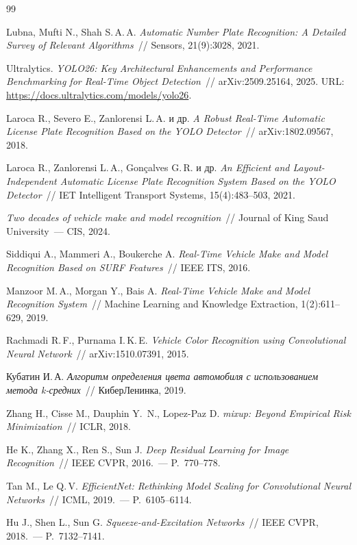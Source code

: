 \documentclass[10pt,a4paper]{report}
\numberwithin{equation}{chapter}
\numberwithin{figure}{chapter}
\numberwithin{table}{chapter}
\begin{document}
\begin{thebibliography}{99}

Lubna, Mufti N., Shah S.\,A.\,A.
\textit{Automatic Number Plate Recognition: A Detailed Survey of Relevant Algorithms}~//
Sensors, 21(9):3028, 2021.

Ultralytics.
\textit{YOLO26: Key Architectural Enhancements and Performance Benchmarking
for Real-Time Object Detection}~// arXiv:2509.25164, 2025.
URL: \url{https://docs.ultralytics.com/models/yolo26}.

Laroca R., Severo E., Zanlorensi L.\,A. и др.
\textit{A Robust Real-Time Automatic License Plate Recognition Based on the YOLO Detector}~//
arXiv:1802.09567, 2018.

Laroca R., Zanlorensi L.\,A., Gonçalves G.\,R. и др.
\textit{An Efficient and Layout-Independent Automatic License Plate Recognition System Based on the YOLO Detector}~//
IET Intelligent Transport Systems, 15(4):483--503, 2021.

\textit{Two decades of vehicle make and model recognition}~//
Journal of King Saud University~--- CIS, 2024.

Siddiqui A., Mammeri A., Boukerche A.
\textit{Real-Time Vehicle Make and Model Recognition Based on SURF Features}~//
IEEE ITS, 2016.

Manzoor M.\,A., Morgan Y., Bais A.
\textit{Real-Time Vehicle Make and Model Recognition System}~//
Machine Learning and Knowledge Extraction, 1(2):611--629, 2019.

Rachmadi R.\,F., Purnama I.\,K.\,E.
\textit{Vehicle Color Recognition using Convolutional Neural Network}~//
arXiv:1510.07391, 2015.

Кубатин И.\,А.
\textit{Алгоритм определения цвета автомобиля с использованием метода k-средних}~//
КиберЛенинка, 2019.

Zhang H., Cisse M., Dauphin Y.~N., Lopez-Paz D.
\textit{mixup: Beyond Empirical Risk Minimization}~//
ICLR, 2018.

He K., Zhang X., Ren S., Sun J.
\textit{Deep Residual Learning for Image Recognition}~//
IEEE CVPR, 2016.~--- P.~770--778.

Tan M., Le Q.\,V.
\textit{EfficientNet: Rethinking Model Scaling for Convolutional Neural Networks}~//
ICML, 2019.~--- P.~6105--6114.

Hu J., Shen L., Sun G.
\textit{Squeeze-and-Excitation Networks}~//
IEEE CVPR, 2018.~--- P.~7132--7141.

\end{thebibliography}
\end{document}
